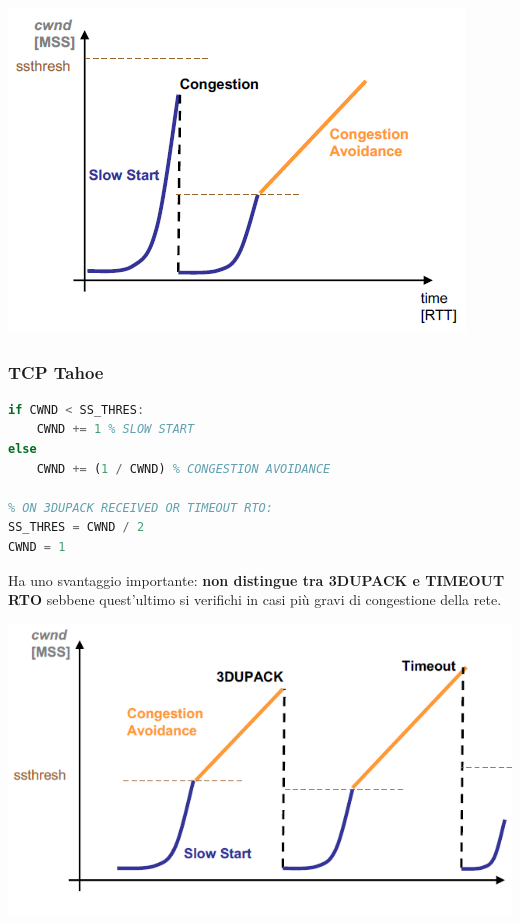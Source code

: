 \documentclass[12pt]{article}
\begin{document}
\begin{center}
    \includegraphics[scale=0.65]{tcp_congestion_algorithm}
\end{center}

\subsubsection{TCP Tahoe}

\begin{lstlisting}[language=Octave]
% ON ACK RECEIVED:
if CWND < SS_THRES:
    CWND += 1 % SLOW START
else
    CWND += (1 / CWND) % CONGESTION AVOIDANCE

% ON 3DUPACK RECEIVED OR TIMEOUT RTO:
SS_THRES = CWND / 2
CWND = 1
\end{lstlisting}
Ha uno svantaggio importante: \textbf{non distingue tra 3DUPACK e TIMEOUT RTO} sebbene quest'ultimo si verifichi in casi più gravi di congestione della rete.

\begin{center}
    \includegraphics[scale=0.5]{tcp_tahoe}
\end{center}
\end{document}
